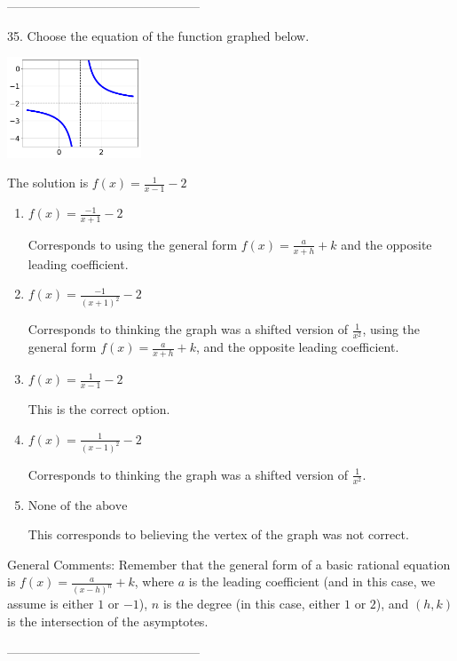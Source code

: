 \documentclass{article}[14pt]
\begin{document}
-----------------------------------------------

35. Choose the equation of the function graphed below.
\begin{center} \includegraphics[width=0.3\textwidth]{../Figures/rationalGraphToEquationA.png} \end{center} 

The solution is $ f(x) = \frac{1}{x - 1} - 2 $ 

\begin{enumerate}[label=\Alph*.] 
\item $ f(x) = \frac{-1}{x + 1} - 2 $ 

 Corresponds to using the general form $f(x) = \frac{a}{x+h}+k$ and the opposite leading coefficient. 
\item $ f(x) = \frac{-1}{(x + 1)^2} - 2 $ 

 Corresponds to thinking the graph was a shifted version of $\frac{1}{x^2}$, using the general form $f(x) = \frac{a}{x+h}+k$, and the opposite leading coefficient. 
\item $ f(x) = \frac{1}{x - 1} - 2 $ 

 This is the correct option. 
\item $ f(x) = \frac{1}{(x - 1)^2} - 2 $ 

 Corresponds to thinking the graph was a shifted version of $\frac{1}{x^2}$. 
\item $ \text{None of the above} $ 

 This corresponds to believing the vertex of the graph was not correct. 
\end{enumerate} 
 
General Comments: Remember that the general form of a basic rational equation is $ f(x) = \frac{a}{(x-h)^n} + k$, where $a$ is the leading coefficient (and in this case, we assume is either $1$ or $-1$), $n$ is the degree (in this case, either $1$ or $2$), and $(h, k)$ is the intersection of the asymptotes.

-----------------------------------------------
\end{document}
